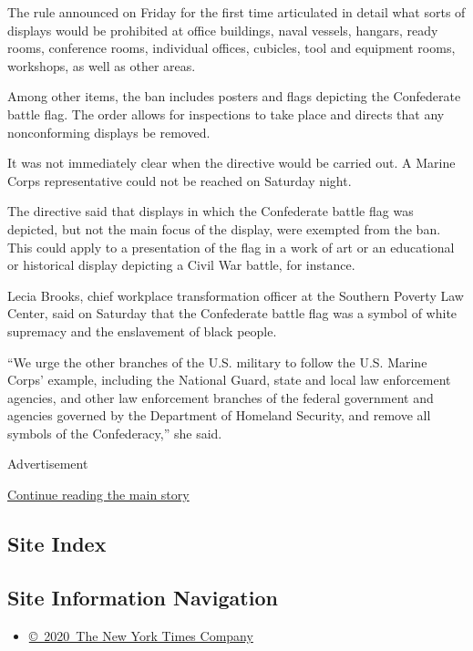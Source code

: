 The rule announced on Friday for the first time articulated in detail
what sorts of displays would be prohibited at office buildings, naval
vessels, hangars, ready rooms, conference rooms, individual offices,
cubicles, tool and equipment rooms, workshops, as well as other areas.

Among other items, the ban includes posters and flags depicting the
Confederate battle flag. The order allows for inspections to take place
and directs that any nonconforming displays be removed.

It was not immediately clear when the directive would be carried out. A
Marine Corps representative could not be reached on Saturday night.

The directive said that displays in which the Confederate battle flag
was depicted, but not the main focus of the display, were exempted from
the ban. This could apply to a presentation of the flag in a work of art
or an educational or historical display depicting a Civil War battle,
for instance.

Lecia Brooks, chief workplace transformation officer at the Southern
Poverty Law Center, said on Saturday that the Confederate battle flag
was a symbol of white supremacy and the enslavement of black people.

``We urge the other branches of the U.S. military to follow the U.S.
Marine Corps' example, including the National Guard, state and local law
enforcement agencies, and other law enforcement branches of the federal
government and agencies governed by the Department of Homeland Security,
and remove all symbols of the Confederacy,'' she said.

Advertisement

\protect\hyperlink{after-bottom}{Continue reading the main story}

\hypertarget{site-index}{%
\subsection{Site Index}\label{site-index}}

\hypertarget{site-information-navigation}{%
\subsection{Site Information
Navigation}\label{site-information-navigation}}

\begin{itemize}
\tightlist
\item
  \href{https://help.nytimes.com/hc/en-us/articles/115014792127-Copyright-notice}{©~2020~The
  New York Times Company}
\end{itemize}

